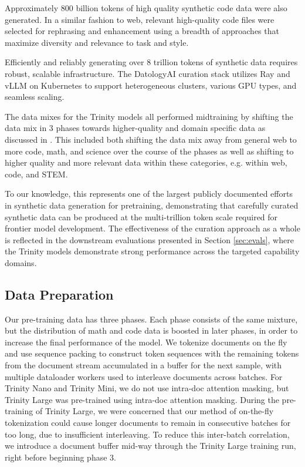 \documentclass{article}
\begin{document}
Approximately 800 billion tokens of high quality synthetic code data were also generated. In a similar fashion to web, relevant high-quality code files were selected for rephrasing and enhancement using a breadth of approaches that maximize diversity and relevance to task and style.

Efficiently and reliably generating over 8 trillion tokens of synthetic data requires robust, scalable infrastructure. The DatologyAI curation stack utilizes Ray and vLLM on Kubernetes to support heterogeneous clusters, various GPU types, and seamless scaling.

The data mixes for the Trinity models all performed midtraining by shifting the data mix in 3 phases towards higher-quality and domain specific data as discussed in \citep{blakeney2024does, hu2024minicpm, olmo20252olmo2furious, allal2025smollm2}. This included both shifting the data mix away from general web to more code, math, and science over the course of the phases as well as shifting to higher quality and more relevant data within these categories, e.g. within web, code, and STEM.

To our knowledge, this represents one of the largest publicly documented efforts in synthetic data generation for pretraining, demonstrating that carefully curated synthetic data can be produced at the multi-trillion token scale required for frontier model development. The effectiveness of the curation approach as a whole is reflected in the downstream evaluations presented in Section \ref{sec:evals}, where the Trinity models demonstrate strong performance across the targeted capability domains.

\subsection{Data Preparation}


Our pre-training data has three phases. Each phase consists of the same mixture, but the distribution of math and code data is boosted in later phases, in order to increase the final performance of the model. We tokenize documents on the fly and use sequence packing to construct token sequences with the remaining tokens from the document stream accumulated in a buffer for the next sample, with multiple dataloader workers used to interleave documents across batches. For Trinity Nano and Trinity Mini, we do not use intra-doc attention masking, but Trinity Large was pre-trained using intra-doc attention masking. During the pre-training of Trinity Large, we were concerned that our method of on-the-fly tokenization could cause longer documents to remain in consecutive batches for too long, due to insufficient interleaving. To reduce this inter-batch correlation, we introduce a document buffer mid-way through the Trinity Large training run, right before beginning phase 3.
\end{document}
